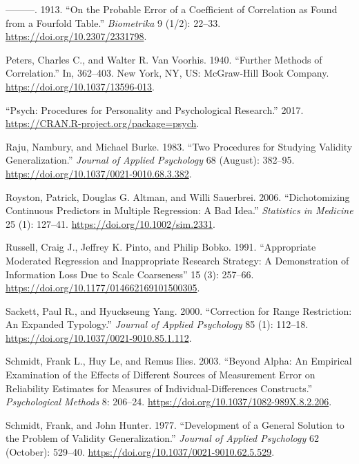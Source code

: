 \documentclass[
  letterpaper,
  DIV=11,
  numbers=noendperiod]{scrreprt}
\newlength{\cslhangindent}
\newlength{\cslentryspacingunit} %
\newenvironment{CSLReferences}[2] %
 {%
  \setlength{\parindent}{0pt}
  \ifodd #1
  \let\oldpar\par
  \def\par{\hangindent=\cslhangindent\oldpar}
  \fi
  \setlength{\parskip}{#2\cslentryspacingunit}
 }%
 {}
\begin{document}
\begin{CSLReferences}{1}{0}
\leavevmode{}%
---------. 1913. {``On the Probable Error of a Coefficient of
Correlation as Found from a Fourfold Table.''} \emph{Biometrika} 9
(1/2): 22--33. \url{https://doi.org/10.2307/2331798}.

\leavevmode{}%
Peters, Charles C., and Walter R. Van Voorhis. 1940. {``Further Methods
of Correlation.''} In, 362--403. New York, NY, US: McGraw-Hill Book
Company. \url{https://doi.org/10.1037/13596-013}.

\leavevmode{}%
{``Psych: Procedures for Personality and Psychological Research.''}
2017. \url{https://CRAN.R-project.org/package=psych}.

\leavevmode{}%
Raju, Nambury, and Michael Burke. 1983. {``Two Procedures for Studying
Validity Generalization.''} \emph{Journal of Applied Psychology} 68
(August): 382--95. \url{https://doi.org/10.1037/0021-9010.68.3.382}.

\leavevmode{}%
Royston, Patrick, Douglas G. Altman, and Willi Sauerbrei. 2006.
{``Dichotomizing Continuous Predictors in Multiple Regression: A Bad
Idea.''} \emph{Statistics in Medicine} 25 (1): 127--41.
\url{https://doi.org/10.1002/sim.2331}.

\leavevmode{}%
Russell, Craig J., Jeffrey K. Pinto, and Philip Bobko. 1991.
{``Appropriate Moderated Regression and Inappropriate Research Strategy:
A Demonstration of Information Loss Due to Scale Coarseness''} 15 (3):
257--66. \url{https://doi.org/10.1177/014662169101500305}.

\leavevmode{}%
Sackett, Paul R., and Hyuckseung Yang. 2000. {``Correction for Range
Restriction: An Expanded Typology.''} \emph{Journal of Applied
Psychology} 85 (1): 112--18.
\url{https://doi.org/10.1037/0021-9010.85.1.112}.

\leavevmode{}%
Schmidt, Frank L., Huy Le, and Remus Ilies. 2003. {``Beyond Alpha: An
Empirical Examination of the Effects of Different Sources of Measurement
Error on Reliability Estimates for Measures of Individual-Differences
Constructs.''} \emph{Psychological Methods} 8: 206--24.
\url{https://doi.org/10.1037/1082-989X.8.2.206}.

\leavevmode{}%
Schmidt, Frank, and John Hunter. 1977. {``Development of a General
Solution to the Problem of Validity Generalization.''} \emph{Journal of
Applied Psychology} 62 (October): 529--40.
\url{https://doi.org/10.1037/0021-9010.62.5.529}.


\end{CSLReferences}
\end{document}
